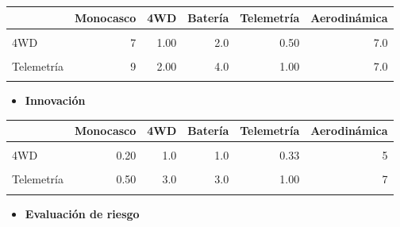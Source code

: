 \documentclass[
]{article}
\providecommand{\tightlist}{%
  \setlength{\itemsep}{0pt}\setlength{\parskip}{0pt}}
\begin{document}
\begin{longtable}[t]{lrrrrr}
\toprule
 & Monocasco & 4WD & Batería & Telemetría & Aerodinámica\\
\midrule
\cellcolor{gray!10}{Monocasco} & \cellcolor{gray!10}{1} & \cellcolor{gray!10}{0.14} & \cellcolor{gray!10}{0.2} & \cellcolor{gray!10}{0.11} & \cellcolor{gray!10}{0.5}\\
4WD & 7 & 1.00 & 2.0 & 0.50 & 7.0\\
\cellcolor{gray!10}{Batería} & \cellcolor{gray!10}{5} & \cellcolor{gray!10}{0.50} & \cellcolor{gray!10}{1.0} & \cellcolor{gray!10}{0.25} & \cellcolor{gray!10}{2.0}\\
Telemetría & 9 & 2.00 & 4.0 & 1.00 & 7.0\\
\cellcolor{gray!10}{Aerodinámica} & \cellcolor{gray!10}{2} & \cellcolor{gray!10}{0.14} & \cellcolor{gray!10}{0.5} & \cellcolor{gray!10}{0.14} & \cellcolor{gray!10}{1.0}\\
\bottomrule
\end{longtable}

\begin{itemize}
\tightlist
\item
  \textbf{Innovación}
\end{itemize}

\begin{longtable}[t]{lrrrrr}
\toprule
 & Monocasco & 4WD & Batería & Telemetría & Aerodinámica\\
\midrule
\cellcolor{gray!10}{Monocasco} & \cellcolor{gray!10}{1.00} & \cellcolor{gray!10}{5.0} & \cellcolor{gray!10}{5.0} & \cellcolor{gray!10}{2.00} & \cellcolor{gray!10}{9}\\
4WD & 0.20 & 1.0 & 1.0 & 0.33 & 5\\
\cellcolor{gray!10}{Batería} & \cellcolor{gray!10}{0.20} & \cellcolor{gray!10}{1.0} & \cellcolor{gray!10}{1.0} & \cellcolor{gray!10}{0.33} & \cellcolor{gray!10}{5}\\
Telemetría & 0.50 & 3.0 & 3.0 & 1.00 & 7\\
\cellcolor{gray!10}{Aerodinámica} & \cellcolor{gray!10}{0.11} & \cellcolor{gray!10}{0.2} & \cellcolor{gray!10}{0.2} & \cellcolor{gray!10}{0.14} & \cellcolor{gray!10}{1}\\
\bottomrule
\end{longtable}

\begin{itemize}
\tightlist
\item
  \textbf{Evaluación de riesgo}
\end{itemize}
\end{document}
